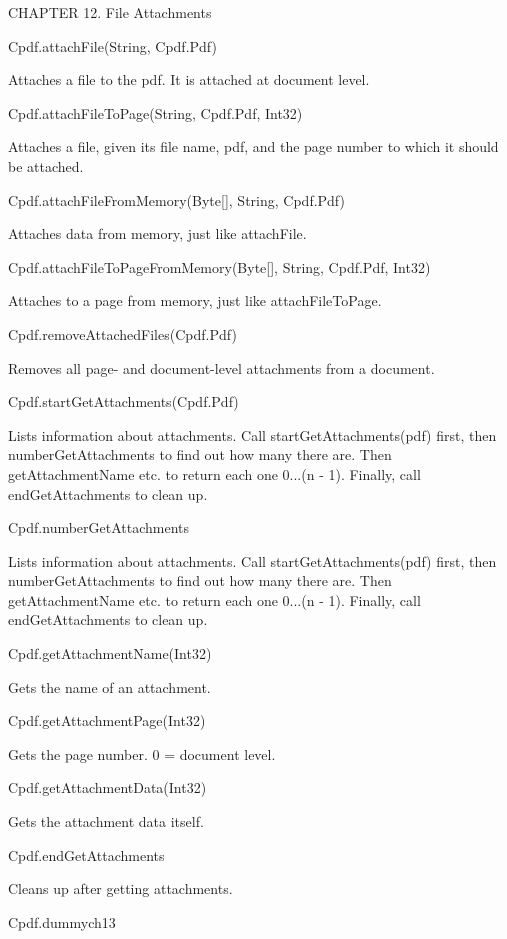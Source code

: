 CHAPTER 12. File Attachments

Cpdf.attachFile(String, Cpdf.Pdf)

Attaches a file to the pdf. It is attached
at document level.

Cpdf.attachFileToPage(String, Cpdf.Pdf, Int32)

Attaches a file, given
its file name, pdf, and the page number to which it should be attached.

Cpdf.attachFileFromMemory(Byte[], String, Cpdf.Pdf)

Attaches data from
memory, just like attachFile.

Cpdf.attachFileToPageFromMemory(Byte[], String, Cpdf.Pdf, Int32)

Attaches to a page from memory, just like attachFileToPage.

Cpdf.removeAttachedFiles(Cpdf.Pdf)

Removes all page- and document-level attachments from a document.

Cpdf.startGetAttachments(Cpdf.Pdf)

Lists information about attachments. Call startGetAttachments(pdf)
first, then numberGetAttachments to find out how many there are. Then
getAttachmentName etc. to return each one 0...(n - 1). Finally, call
endGetAttachments to clean up.

Cpdf.numberGetAttachments

Lists information about attachments. Call startGetAttachments(pdf)
first, then numberGetAttachments to find out how many there are. Then
getAttachmentName etc. to return each one 0...(n - 1). Finally, call
endGetAttachments to clean up.

Cpdf.getAttachmentName(Int32)

Gets the name of an attachment.

Cpdf.getAttachmentPage(Int32)

Gets the page number. 0 = document level.

Cpdf.getAttachmentData(Int32)

Gets the attachment data itself.

Cpdf.endGetAttachments

Cleans up after getting attachments.

Cpdf.dummych13

